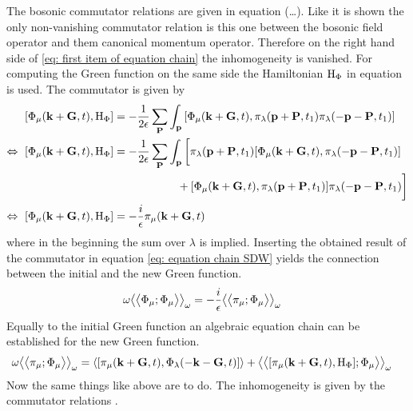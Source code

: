 The bosonic commutator relations are given in equation (\dots{}).
Like it is shown the only non-vanishing commutator relation is this one between the bosonic field operator and them canonical momentum operator.
Therefore on the right hand side of \eqref{eq: first item of equation chain} the inhomogeneity is vanished.
For computing the Green function on the same side the Hamiltonian $\mathrm{H}_{\Phi}$ in equation  is used.
The commutator is given by
%
\begin{align}
	\comm{\Phi_{\mu}(\vb{k}+\vb{G},t)}{\mt{H}_{\Phi}} &= 
		-\frac{1}{2\epsilon} 
		\sum\limits_{\vb{P}} 
		\int_{\vb{p}}
		\comm{\Phi_{\mu}(\vb{k}+\vb{G},t)}{\pi_{\lambda}(\vb{p}+\vb{P},t_{1}) \pi_{\lambda}(-\vb{p}-\vb{P},t_{1})}
	\notag \\
	\Leftrightarrow\ \comm{\Phi_{\mu}(\vb{k}+\vb{G},t)}{\mt{H}_{\Phi}} &= 
		-\frac{1}{2\epsilon} 
		\sum\limits_{\vb{P}} 
		\int_{\vb{p}} \bigg[
			\pi_{\lambda}(\vb{p}+\vb{P},t_{1}) \comm{\Phi_{\mu}(\vb{k}+\vb{G},t)}{\pi_{\lambda}(-\vb{p}-\vb{P},t_{1})}
			\notag \\& \hspace{2cm}
			+
			\comm{\Phi_{\mu}(\vb{k}+\vb{G},t)}{\pi_{\lambda}(\vb{p}+\vb{P},t_{1})} \pi_{\lambda}(-\vb{p}-\vb{P},t_{1})
		\bigg]
	\notag \\
	\Leftrightarrow\ \comm{\Phi_{\mu}(\vb{k}+\vb{G},t)}{\mt{H}_{\Phi}} &= 
		-\frac{i}{\epsilon} \pi_{\mu}(\vb{k}+\vb{G},t)
\end{align}
%
where in the beginning the sum over $\lambda$ is implied.
Inserting the obtained result of the commutator in equation \eqref{eq: equation chain SDW} yields the connection between the initial and the new Green function.
%
\begin{align}
	\omega \big\langle\big\langle{\Phi_{\mu}};{\Phi_{\mu}}\big\rangle\big\rangle_{\omega} &= 
		-\frac{i}{\epsilon} \big\langle\big\langle{\pi_{\mu}};{\Phi_{\mu}}\big\rangle\big\rangle_{\omega}
	\label{eq: first item of the chain}
\end{align}
%
Equally to the initial Green function an algebraic equation chain can be established for the new Green function.
%
\begin{align}
	\omega \green{\pi_{\mu}}{\Phi_{\mu}}_{\omega} &= 
		\expval{\comm{\pi_{\mu}(\vb{k}+\vb{G},t)}{\Phi_{\lambda}(-\vb{k}-\vb{G},t)}}
		+
		\green{\comm{\pi_{\mu}(\vb{k}+\vb{G},t)}{\mt{H}_{\Phi}}}{\Phi_{\mu}}_{\omega}
\end{align}
%
Now the same things like above are to do.
The inhomogeneity is given by the commutator relations .
